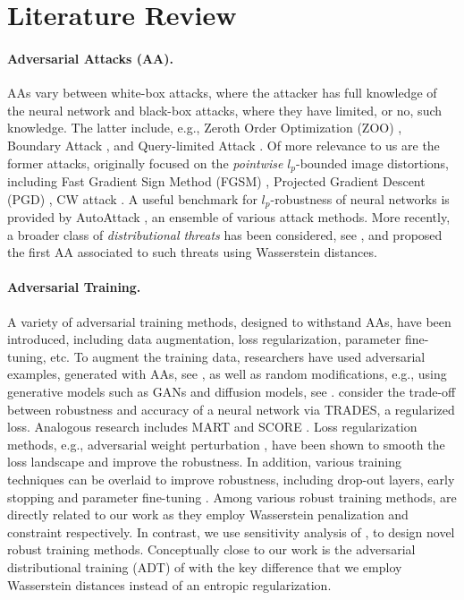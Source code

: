 \section{Literature Review}
\paragraph{Adversarial Attacks (AA).}
AAs vary between white-box attacks, where the attacker has full knowledge of the neural network and black-box attacks, where they have limited, or no, such knowledge. The latter include, e.g., Zeroth Order Optimization (ZOO) \citep{CZS+17}, Boundary Attack \citep{BRB18}, and Query-limited Attack \citep{IEAL18}. Of more relevance to us are the former attacks, originally focused on the \emph{pointwise} \(l_{p}\)-bounded image distortions, including Fast Gradient Sign Method (FGSM) \citep{GSS15}, Projected Gradient Descent (PGD) \citep{MMS+18}, CW attack \citep{CW17}. A useful benchmark for \(l_{p}\)-robustness of neural networks is provided by AutoAttack \citep{CH20}, an ensemble of various attack methods. More recently, a broader class of \emph{distributional threats} has been considered, see \citet{SJ17,SND18}, and \citet{BHJO23Wasserstein} proposed the first AA associated to such threats using Wasserstein distances. 

\paragraph{Adversarial Training.}
A variety of adversarial training methods, designed to withstand AAs,  have been introduced, including data augmentation, loss regularization, parameter fine-tuning, etc. 
To augment the training data, researchers have used adversarial examples, generated with AAs, see \citep{GSS15,MMS+18,TKP+18}, as well as random modifications, e.g., using generative models such as GANs and diffusion models, see \citep{GRW+21,XSC22,wang2023better}. 
\citet{zhang2019theoretically} consider the trade-off between robustness and accuracy of a neural network via TRADES, a regularized loss. Analogous research includes MART \citep{WZY+20} and SCORE \citep{PLY+22}. 
Loss regularization methods, e.g., adversarial weight perturbation \citep{WXW20}, have been shown to smooth the loss landscape and improve the robustness. 
In addition, various training techniques can be overlaid to improve robustness, including drop-out layers, early stopping and parameter fine-tuning \citet{SWMJ20}.
Among various robust training methods, \citet{SND18,GG22} are directly related to our work as they employ Wasserstein penalization and constraint respectively. In contrast, we use sensitivity analysis of \citet{BDOW21}, to design novel robust training methods. Conceptually close to our work is the adversarial distributional training (ADT) of \citep{DDP+20} with the key difference that we employ Wasserstein distances instead of an entropic regularization. 


